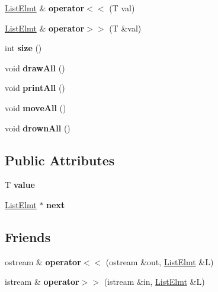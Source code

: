 \begin{DoxyCompactItemize}
\mbox{\hyperlink{class_list_1_1_list_elmt}{List\+Elmt}} \& {\bfseries operator$<$$<$} (T val)
\item 
\mbox{\label{class_list_1_1_list_elmt_aa4eca3f1464853446749f71f5e4b3a75}} 
\mbox{\hyperlink{class_list_1_1_list_elmt}{List\+Elmt}} \& {\bfseries operator$>$$>$} (T \&val)
\item 
\mbox{\label{class_list_1_1_list_elmt_ae6c3454b32232bc27b4e3887436e0f5a}} 
int {\bfseries size} ()
\item 
\mbox{\label{class_list_1_1_list_elmt_a55c438b06cd2c6f10d6cbaf4b72f8f7e}} 
void {\bfseries draw\+All} ()
\item 
\mbox{\label{class_list_1_1_list_elmt_a99c0d22ad34a738a7864abc39352d53e}} 
void {\bfseries print\+All} ()
\item 
\mbox{\label{class_list_1_1_list_elmt_af273cbab167d2664eb32658af35f9139}} 
void {\bfseries move\+All} ()
\item 
\mbox{\label{class_list_1_1_list_elmt_af25990e73eacc00fcbdf9b2805fcf1a9}} 
void {\bfseries drown\+All} ()
\end{DoxyCompactItemize}
\subsection*{Public Attributes}
\begin{DoxyCompactItemize}
\item 
\mbox{\label{class_list_1_1_list_elmt_a4fef3eaff9c2e20ff9b2212f6f142329}} 
T {\bfseries value}
\item 
\mbox{\label{class_list_1_1_list_elmt_a8c4d50e468d7832c816b6fcaef04157d}} 
\mbox{\hyperlink{class_list_1_1_list_elmt}{List\+Elmt}} $\ast$ {\bfseries next}
\end{DoxyCompactItemize}
\subsection*{Friends}
\begin{DoxyCompactItemize}
\item 
\mbox{\label{class_list_1_1_list_elmt_a05cb8dec2afd3ce9e7b792c70b3804dd}} 
ostream \& {\bfseries operator$<$$<$} (ostream \&out, \mbox{\hyperlink{class_list_1_1_list_elmt}{List\+Elmt}} \&L)
\item 
\mbox{\label{class_list_1_1_list_elmt_ac932b9a069cfc0c2e3ca8924e98da68e}} 
istream \& {\bfseries operator$>$$>$} (istream \&in, \mbox{\hyperlink{class_list_1_1_list_elmt}{List\+Elmt}} \&L)
\end{DoxyCompactItemize}


